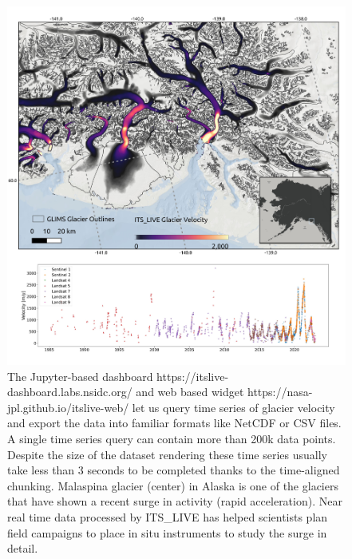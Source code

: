 \documentclass[
  super,
  preprint,
  3p,
  twocolumn]{elsarticle}
\begin{document}
\begin{figure}

{\centering 

\includegraphics{figures/figure-4.jpg}

}

\caption{\label{fig-2}The Jupyter-based dashboard
https://itslive-dashboard.labs.nsidc.org/ and web based widget
https://nasa-jpl.github.io/itslive-web/ let us query time series of
glacier velocity and export the data into familiar formats like NetCDF
or CSV files. A single time series query can contain more than 200k data
points. Despite the size of the dataset rendering these time series
usually take less than 3 seconds to be completed thanks to the
time-aligned chunking. Malaspina glacier (center) in Alaska is one of
the glaciers that have shown a recent surge in activity (rapid
acceleration). Near real time data processed by ITS\_LIVE has helped
scientists plan field campaigns to place in situ instruments to study
the surge in detail.}

\end{figure}
\end{document}
